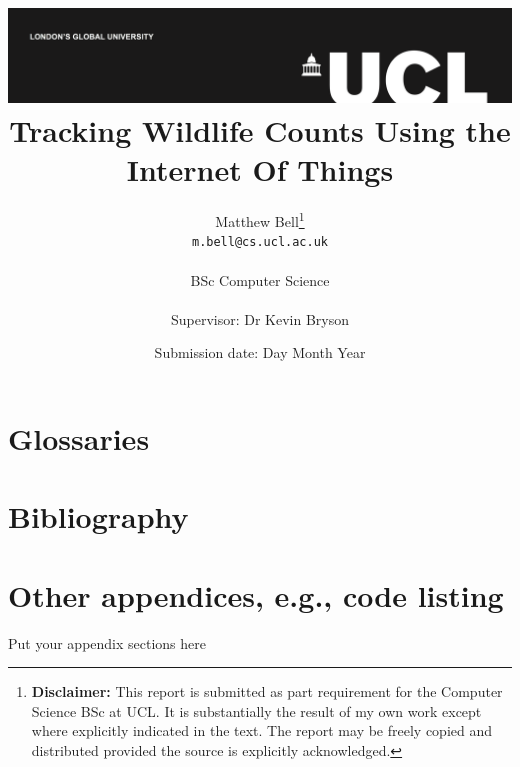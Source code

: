 \documentclass[a4paper]{report}
\title{{\vspace{-14em} \includegraphics[scale=0.4]{ucl_logo.png}}\\
{{\Huge Tracking Wildlife Counts Using the Internet Of Things}}\\
}
\date{Submission date: Day Month Year}
\author{Matthew Bell\thanks{
{\bf Disclaimer:}
This report is submitted as part requirement for the Computer Science BSc at
UCL. It is substantially the result of my own work except where explicitly
indicated in the text.
The report may be freely copied and distributed provided the source is explicitly acknowledged.}
\\ 
\texttt{m.bell@cs.ucl.ac.uk}\\ \\
BSc Computer Science\\ \\
Supervisor: Dr Kevin Bryson}
\begin{document}
 
\onehalfspacing
\maketitle
\begin{abstract}
  
\end{abstract}


\tableofcontents
\setcounter{page}{1}






\nocite{*}

\renewcommand{\chaptername}{Appendix}
\appendix

\chapter{Glossaries}
\printglossaries

\chapter{Bibliography}
\printbibliography[heading=bibempty]

\chapter{Other appendices, e.g., code listing}
Put your appendix sections here
\end{document}
